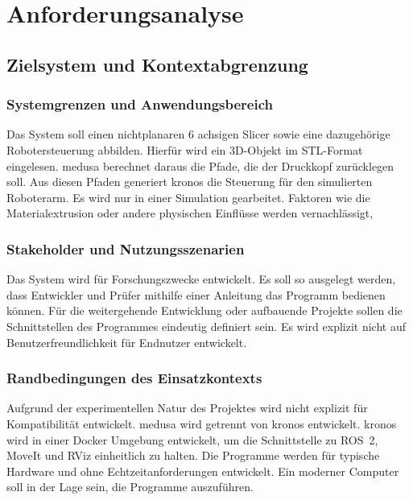 
\chapter{Anforderungsanalyse}\label{chap:requirements-analysis}

    \section{Zielsystem und Kontextabgrenzung}\label{sec:target-system-and-context-delimitation}
        \subsection{Systemgrenzen und Anwendungsbereich}\label{subsec:system-boundaries-and-application-scope}
            Das System soll einen nichtplanaren 6 achsigen Slicer sowie eine dazugehörige Robotersteuerung abbilden.
            Hierfür wird ein 3D-Objekt im \ac{STL}-Format eingelesen.
            \ac{medusa} berechnet daraus die Pfade, die der Druckkopf zurücklegen soll.
            Aus diesen Pfaden generiert \ac{kronos} die Steuerung für den simulierten Roboterarm.
            Es wird nur in einer Simulation gearbeitet.
            Faktoren wie die Materialextrusion oder andere physischen Einflüsse werden vernachlässigt,

        \subsection{Stakeholder und Nutzungsszenarien}\label{subsec:stakeholders-and-usage-scenarios}
            Das System wird für Forschungszwecke entwickelt.
            Es soll so ausgelegt werden, dass Entwickler und Prüfer mithilfe einer Anleitung das Programm bedienen können.
            Für die weitergehende Entwicklung oder aufbauende Projekte sollen die Schnittstellen des Programmes eindeutig definiert sein.
            Es wird explizit nicht auf Benutzerfreundlichkeit für Endnutzer entwickelt.

        \subsection{Randbedingungen des Einsatzkontexts} \label{subsec:boundary-conditions-of-deployment-context}
            Aufgrund der experimentellen Natur des Projektes wird nicht explizit für Kompatibilität entwickelt.
            \ac{medusa} wird getrennt von \ac{kronos} entwickelt.
            \ac{kronos} wird in einer Docker Umgebung entwickelt, um die Schnittstelle zu \ac{ROS}~2, MoveIt und RViz einheitlich zu halten.
            Die Programme werden für typische Hardware und ohne Echtzeitanforderungen entwickelt.
            Ein moderner Computer soll in der Lage sein, die Programme auszuführen.
  

